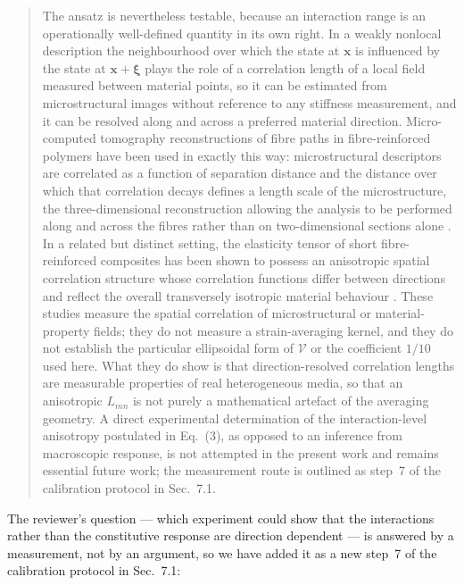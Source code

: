 \documentclass[12pt,a4paper]{article}
\begin{document}
\begin{quote}\small
The ansatz is nevertheless testable, because an interaction
range is an operationally well-defined quantity in its own right. In a
weakly nonlocal description the neighbourhood over which the state at
$\mathbf{x}$ is influenced by the state at $\mathbf{x}+\boldsymbol{\xi}$
plays the role of a correlation length of a local field measured between
material points, so it can be estimated from microstructural images
without reference to any stiffness measurement, and it can be resolved
along and across a preferred material direction. Micro-computed
tomography reconstructions of fibre paths in fibre-reinforced polymers
have been used in exactly this way: microstructural descriptors are
correlated as a function of separation distance and the distance over
which that correlation decays defines a length scale of the
microstructure, the three-dimensional reconstruction allowing the
analysis to be performed along and across the fibres rather than on
two-dimensional sections alone \cite{Schey2019,ScheyStapleton2022}. In a
related but distinct setting, the elasticity tensor of short
fibre-reinforced composites has been shown to possess an anisotropic
spatial correlation structure whose correlation functions differ between
directions and reflect the overall transversely isotropic material
behaviour \cite{RauterLammering2020}. These studies measure the spatial
correlation of microstructural or material-property fields; they do not
measure a strain-averaging kernel, and they do not establish the
particular ellipsoidal form of $\mathcal{V}$ or the coefficient $1/10$
used here. What they do show is that direction-resolved correlation
lengths are measurable properties of real heterogeneous media, so that
an anisotropic $L_{mn}$ is not purely a mathematical artefact of the
averaging geometry. A direct experimental determination of the
interaction-level anisotropy postulated in Eq.~(3),
as opposed to an inference from macroscopic response, is not attempted in
the present work and remains essential future work; the measurement
route is outlined as step~7 of the calibration protocol in
Sec.~7.1.
\end{quote}

The reviewer's question --- which experiment could show that the interactions rather than the constitutive response are direction dependent --- is answered by a measurement, not by an argument, so we have added it as a new step~7 of the calibration protocol in Sec.~7.1:
\end{document}
